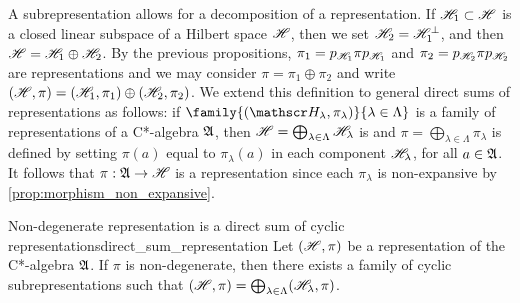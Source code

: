 A subrepresentation allows for a decomposition of a representation. If \(\mathscr{H}_1 \subset \mathscr{H}\) is a closed linear subspace of a Hilbert space \(\mathscr{H}\), then we set \(\mathscr{H}_2 = \mathscr{H}_1^{\perp}\), and then \(\mathscr{H} = \mathscr{H}_1 \oplus \mathscr{H}_2\). By the previous propositions, \(\pi_1 = p_{\mathscr{H}_1} \pi p_{\mathscr{H}_1}\) and \(\pi_2 = p_{\mathscr{H}_2} \pi p_{\mathscr{H}_2}\) are representations and we may consider \(\pi = \pi_1 \oplus \pi_2\) and write \((\mathscr{H}, \pi) = (\mathscr{H}_1, \pi_1) \oplus (\mathscr{H}_2, \pi_2)\). We extend this definition to general direct sums of representations as follows: if \(\family{(\hilbert_{\lambda}, \pi_{\lambda})}{\lambda \in \Lambda}\) is a family of representations of a C*-algebra \(\mathfrak{A}\), then \(\mathscr{H} = \bigoplus_{\lambda \in \Lambda} \mathscr{H}_{\lambda}\) is  and \(\pi = \bigoplus_{\lambda \in \Lambda} \pi_{\lambda}\) is defined by setting \(\pi(a)\) equal to \(\pi_{\lambda}(a)\) in each component \(\mathscr{H}_{\lambda}\), for all \(a \in \mathfrak{A}\). It follows that \(\pi : \mathfrak{A} \to \mathscr{H}\) is a representation since each \(\pi_{\lambda}\) is non-expansive by \cref{prop:morphism_non_expansive}.
\begin{proposition}{Non-degenerate representation is a direct sum of cyclic representations}{direct_sum_representation}
    Let \((\mathscr{H}, \pi)\) be a representation of the C*-algebra \(\mathfrak{A}\). If \(\pi\) is non-degenerate, then there exists a family of cyclic subrepresentations \family{(\hilbert_{\lambda}, \pi_{\lambda}, \Omega_\lambda)}{\lambda \in \Lambda} such that \((\mathscr{H}, \pi) = \bigoplus_{\lambda \in \Lambda}(\mathscr{H}_{\lambda}, \pi)\).
\end{proposition}
